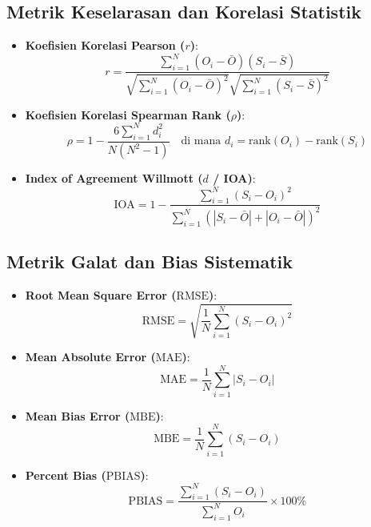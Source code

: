 \documentclass[11pt,a4paper]{article}
\begin{document}
\subsection{Metrik Keselarasan dan Korelasi Statistik}
\begin{itemize}[leftmargin=*]
    \item \textbf{Koefisien Korelasi Pearson ($r$)}:
    \begin{equation}
        r = \frac{\sum_{i=1}^N (O_i - \bar{O})(S_i - \bar{S})}{\sqrt{\sum_{i=1}^N (O_i - \bar{O})^2} \sqrt{\sum_{i=1}^N (S_i - \bar{S})^2}}
    \end{equation}
    \item \textbf{Koefisien Korelasi Spearman Rank ($\rho$)}:
    \begin{equation}
        \rho = 1 - \frac{6 \sum_{i=1}^N d_i^2}{N(N^2 - 1)} \quad \text{di mana } d_i = \text{rank}(O_i) - \text{rank}(S_i)
    \end{equation}
    \item \textbf{Index of Agreement Willmott ($d$ / IOA)}:
    \begin{equation}
        \text{IOA} = 1 - \frac{\sum_{i=1}^N (S_i - O_i)^2}{\sum_{i=1}^N \left(|S_i - \bar{O}| + |O_i - \bar{O}|\right)^2}
    \end{equation}
\end{itemize}

\subsection{Metrik Galat dan Bias Sistematik}
\begin{itemize}[leftmargin=*]
    \item \textbf{Root Mean Square Error ($\text{RMSE}$)}:
    \begin{equation}
        \text{RMSE} = \sqrt{\frac{1}{N} \sum_{i=1}^N (S_i - O_i)^2}
    \end{equation}
    \item \textbf{Mean Absolute Error ($\text{MAE}$)}:
    \begin{equation}
        \text{MAE} = \frac{1}{N} \sum_{i=1}^N |S_i - O_i|
    \end{equation}
    \item \textbf{Mean Bias Error ($\text{MBE}$)}:
    \begin{equation}
        \text{MBE} = \frac{1}{N} \sum_{i=1}^N (S_i - O_i)
    \end{equation}
    \item \textbf{Percent Bias ($\text{PBIAS}$)}:
    \begin{equation}
        \text{PBIAS} = \frac{\sum_{i=1}^N (S_i - O_i)}{\sum_{i=1}^N O_i} \times 100\%
    \end{equation}
\end{itemize}
\end{document}
